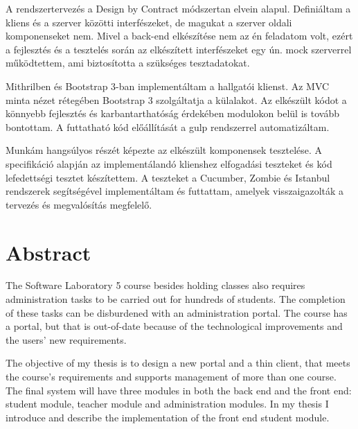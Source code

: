 A rendszertervezés a Design by Contract módszertan elvein alapul. Definiáltam a kliens és a szerver közötti interfészeket, de magukat a szerver oldali komponenseket nem. Mivel a back-end elkészítése nem az én feladatom volt, ezért a fejlesztés és a tesztelés során az elkészített interfészeket egy ún. mock szerverrel működtettem, ami biztosította a szükséges tesztadatokat.

Mithrilben és Bootstrap 3-ban implementáltam a hallgatói klienst. Az MVC minta nézet rétegében Bootstrap 3 szolgáltatja a külalakot. Az elkészült kódot a könnyebb fejlesztés és karbantarthatóság érdekében modulokon belül is tovább bontottam. A futtatható kód előállítását a gulp rendszerrel automatizáltam.

Munkám hangsúlyos részét képezte az elkészült komponensek tesztelése. A specifikáció alapján az implementálandó klienshez elfogadási teszteket és kód lefedettségi tesztet készítettem. A teszteket a Cucumber, Zombie és Istanbul rendszerek segítségével implementáltam és futtattam, amelyek visszaigazolták a tervezés és megvalósítás megfelelő.





\vfill
{}
\englishParagraph


\chapter*{Abstract}


The Software Laboratory 5 course besides holding classes also requires administration tasks to be carried out for hundreds of students. The completion of these tasks can be disburdened with an administration portal. The course has a portal, but that is out-of-date because of the technological improvements and the users' new requirements.

The objective of my thesis is to design a new portal and a thin client, that meets the course's requirements and supports management of more than one course. The final system will have three modules in both the back end and the front end: student module, teacher module and administration modules. In my thesis I introduce and describe the implementation of the front end student module.

